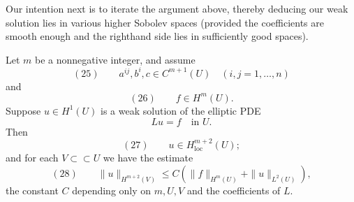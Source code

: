 Our intention next is to iterate the argument above, thereby deducing our weak solution lies in various higher Sobolev spaces (provided the coefficients are smooth enough and the righthand side lies in sufficiently good spaces).

\begin{theorem}
\label{thm:higher-interior-regularity}
Let $m$ be a nonnegative integer, and assume
$$(25) \qquad a^{ij}, b^i, c \in C^{m+1}(U) \quad (i,j=1,\ldots,n)$$
and
$$(26) \qquad f \in H^m(U).$$
Suppose $u \in H^1(U)$ is a weak solution of the elliptic PDE
$$Lu = f \quad \text{in } U.$$
Then
$$(27) \qquad u \in H^{m+2}_{\text{loc}}(U);$$
and for each $V \subset\subset U$ we have the estimate
$$(28) \qquad \|u\|_{H^{m+2}(V)} \leq C(\|f\|_{H^m(U)} + \|u\|_{L^2(U)}),$$
the constant $C$ depending only on $m, U, V$ and the coefficients of $L$.
\end{theorem}

